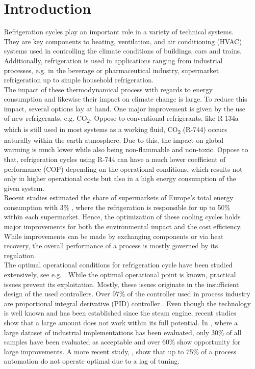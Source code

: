 \chapter{Introduction}\label{c:intro}

Refrigeration cycles play an important role in a variety of technical systems. They are key components to heating, ventilation, and air conditioning (HVAC) systems used in controlling the climate conditions of buildings, cars and trains. Additionally, refrigeration is used in applications ranging from industrial processes, e.g. in the beverage or pharmaceutical industry, supermarket refrigeration up to simple household refrigeration.\\

The impact of these thermodynamical process with regards to energy consumption and likewise their impact on climate change is large. To reduce this impact, several options lay at hand. One major improvement is given by the use of new refrigerants, e.g. CO\textsubscript{2}. Oppose to conventional refrigerants, like R-134a which is still used in most systems as a working fluid, CO\textsubscript{2} (R-744) occurs naturally within the earth atmosphere. Due to this, the impact on global warming is much lower while also being non-flammable and non-toxic. Oppose to that, refrigeration cycles using R-744 can have a much lower coefficient of performance (COP) depending on the operational conditions, which results not only in higher operational costs but also in a high energy consumption of the given system.\\

Recent studies estimated the share of supermarkets of Europe's total energy consumption with 3\% \cite{Arias2005b}, where the refrigeration is responsible for up to 50\% \cite{Rhiemeier2009} within each supermarket. Hence, the optimization of these cooling cycles holds major improvements for both the environmental impact and the cost efficiency. While improvements can be made by exchanging components or via heat recovery, the overall performance of a process is mostly governed by its regulation.\\

The optimal operational conditions for refrigeration cycle have been studied extensively, see e.g. \cite{Jensen2007}. While the optimal operational point is known, practical issues prevent its exploitation. Mostly, these issues originate in the insufficient design of the used controllers. Over 97\% of the controller used in process industry are proportional integral derivative (PID) controller \cite{Desborough2002}. Even though the technology is well known and has been established since the steam engine, recent studies show that a large amount does not work within its full potential. In \cite{Desborough2002}, where a large dataset of industrial implementations has been evaluated, only 30\% of all samples have been evaluated as acceptable and over 60\% show opportunity for large improvements. A more recent study, \cite{Starr2016}, show that up to 75\% of a process automation do not operate optimal due to a lag of tuning.\\

